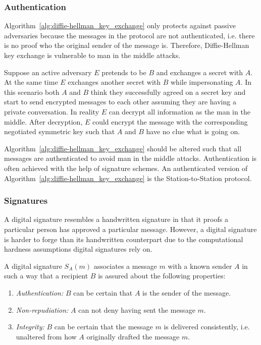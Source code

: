 \subsubsection{Authentication}
Algorithm~\ref{alg:diffie-hellman_key_exchange} only protects against passive adversaries because the messages in the protocol are not authenticated, i.e. there is no proof who the original sender of the message is. Therefore, Diffie-Hellman key exchange is vulnerable to man in the middle attacks. 

Suppose an active adversary $E$ pretends to be $B$ and exchanges a secret with $A$. At the same time $E$ exchanges another secret with $B$ while impersonating $A$. In this scenario both $A$ and $B$ think they successfully agreed on a secret key and start to send encrypted messages to each other assuming they are having a private conversation. In reality $E$ can decrypt all information as the man in the middle. After decryption, $E$ could encrypt the message with the corresponding negotiated symmetric key such that $A$ and $B$ have no clue what is going on.

Algorithm~\ref{alg:diffie-hellman_key_exchange} should be altered such that all messages are authenticated to avoid man in the middle attacks. Authentication is often achieved with the help of signature schemes. An authenticated version of Algorithm~\ref{alg:diffie-hellman_key_exchange} is the Station-to-Station protocol.

\subsubsection{Signatures}
A digital signature resembles a handwritten signature in that it proofs a particular person has approved a particular message. However, a digital signature is harder to forge than its handwritten counterpart due to the computational hardness assumptions digital signatures rely on.

\begin{defn}
\label{def:digital_signature}
 A digital signature $S_A \left( m \right)$ associates a message $m$ with a known sender $A$ in such a way that a recipient $B$ is assured about the following properties:
 \begin{enumerate}
  \item \textit{Authentication:} $B$ can be certain that $A$ is the sender of the message.
  \item \textit{Non-repudiation:} $A$ can not deny having sent the message $m$.
  \item \textit{Integrity:} $B$ can be certain that the message $m$ is delivered consistently, i.e. unaltered from how $A$ originally drafted the message $m$.
 \end{enumerate}
\end{defn}

